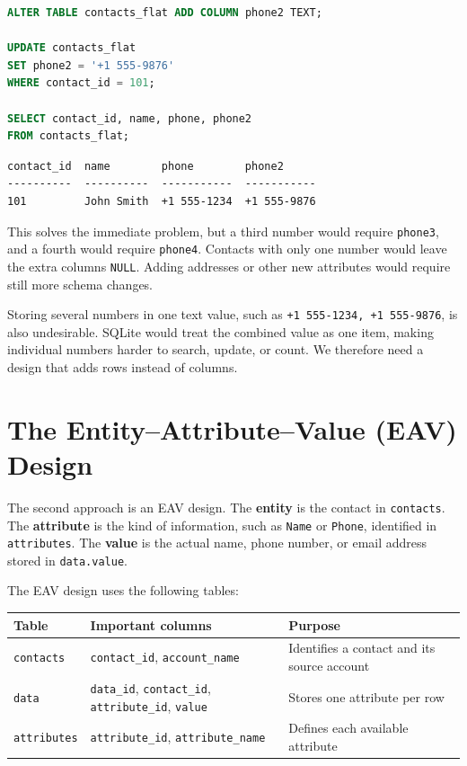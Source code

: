 \documentclass[11pt]{article}
\begin{document}
\begin{lstlisting}[language=SQL]
ALTER TABLE contacts_flat ADD COLUMN phone2 TEXT;

UPDATE contacts_flat
SET phone2 = '+1 555-9876'
WHERE contact_id = 101;

SELECT contact_id, name, phone, phone2
FROM contacts_flat;
\end{lstlisting}

\begin{verbatim}
contact_id  name        phone        phone2
----------  ----------  -----------  -----------
101         John Smith  +1 555-1234  +1 555-9876
\end{verbatim}

This solves the immediate problem, but a third number would require
\texttt{phone3}, and a fourth would require \texttt{phone4}. Contacts with only
one number would leave the extra columns \texttt{NULL}. Adding addresses or
other new attributes would require still more schema changes.

Storing several numbers in one text value, such as
\texttt{+1 555-1234, +1 555-9876}, is also undesirable. SQLite would treat the
combined value as one item, making individual numbers harder to search, update,
or count. We therefore need a design that adds rows instead of columns.

\section*{The Entity--Attribute--Value (EAV) Design}

The second approach is an EAV design. The \textbf{entity} is the contact in
\texttt{contacts}. The \textbf{attribute} is the kind of information, such as
\texttt{Name} or \texttt{Phone}, identified in \texttt{attributes}. The
\textbf{value} is the actual name, phone number, or email address stored in
\texttt{data.value}.

The EAV design uses the following tables:

\begin{center}
\begin{tabular}{@{}>{\raggedright\arraybackslash}p{}
                    >{\raggedright\arraybackslash}p{}
                    >{\raggedright\arraybackslash}p{}@{}}
\toprule
Table & Important columns & Purpose \\
\midrule
\texttt{contacts} & \texttt{contact\_id}, \texttt{account\_name}
    & Identifies a contact and its source account \\
\texttt{data} & \texttt{data\_id}, \texttt{contact\_id}, \texttt{attribute\_id}, \texttt{value}
    & Stores one attribute per row \\
\texttt{attributes} & \texttt{attribute\_id}, \texttt{attribute\_name}
    & Defines each available attribute \\
\bottomrule
\end{tabular}
\end{center}
\end{document}
